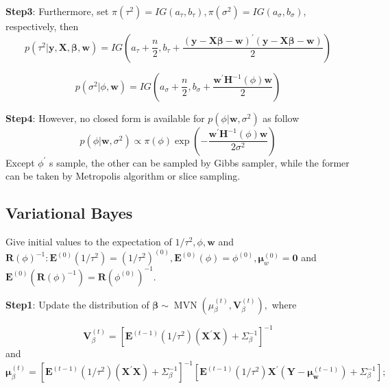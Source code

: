 \documentclass[
]{article}
\begin{document}
\textbf{Step3}: Furthermore, set
\(\pi\left(\tau^{2}\right)=I G\left(a_{\tau}, b_{\tau}\right), \pi\left(\sigma^{2}\right)=I G\left(a_{\sigma}, b_{\sigma}\right),\)
respectively, then \begin{equation}
p\left(\tau^{2} | \boldsymbol{y}, \boldsymbol{X}, \boldsymbol{\beta}, \boldsymbol{w}\right)=I G\left(a_{\tau}+\frac{n}{2}, b_{\tau}+\frac{(\boldsymbol{y}-\boldsymbol{X} \boldsymbol{\beta}-\boldsymbol{w})^{\prime}(\boldsymbol{y}-\boldsymbol{X} \boldsymbol{\beta}-\boldsymbol{w})}{2}\right)
\end{equation}

\begin{equation}
p\left(\sigma^{2} | \phi, \boldsymbol{w}\right)=I G\left(a_{\sigma}+\frac{n}{2}, b_{\sigma}+\frac{\boldsymbol{w}^{\prime} \boldsymbol{H}^{-1}(\phi) \boldsymbol{w}}{2}\right)
\end{equation}

\textbf{Step4}: However, no closed form is available for
\(p\left(\phi | \boldsymbol{w}, \sigma^{2}\right)\) as follow
\begin{equation}
p\left(\phi | \boldsymbol{w}, \sigma^{2}\right) \propto \pi(\phi) \exp \left(-\frac{\boldsymbol{w}^{\prime} \boldsymbol{H}^{-1}(\phi) \boldsymbol{w}}{2\sigma^2}\right)
\end{equation} Except \(\phi^{\prime}\) s sample, the other can be
sampled by Gibbs sampler, while the former can be taken by Metropolis
algorithm or slice sampling.

\hypertarget{variational-bayes}{%
\subsection{Variational Bayes}\label{variational-bayes}}

Give initial values to the expectation of
\(1 / \tau^{2}, \phi, \mathbf{w}\) and
\(\mathbf{R}(\phi)^{-1} : \mathbf{E}^{(0)}\left(1 / \tau^{2}\right)=\left(1 / \tau^{2}\right)^{(0)}, \mathbf{E}^{(0)}(\phi)=\phi^{(0)}, \bm{\mu}_{w}^{(0)}=\mathbf{0}\)
and
\(\mathbf{E}^{(0)}\left(\mathbf{R}(\phi)^{-1}\right)=\mathbf{R}\left(\phi^{(0)}\right)^{-1}.\)

\textbf{Step1}: Update the distribution of
\(\bm{\beta} \sim \operatorname{MVN}\left(\mu_{\beta}^{(t)}, \mathbf{V}_{\beta}^{(t)}\right),\)
where

\[\mathbf{V}_{\beta}^{(t)}=\left[\bm{E}^{(t-1)}\left(1 / \tau^{2}\right)\left(\mathbf{X}^{\prime} \mathbf{X}\right) + \Sigma_\beta^{- 1} \right]^{-1}\]
and
\[\bm{\mu}_{\beta}^{(t)}=\left[\bm{E}^{(t-1)}\left(1 / \tau^{2}\right)\left(\mathbf{X}^{\prime} \mathbf{X}\right) + \Sigma_\beta^{- 1} \right]^{-1} \left[\bm{E}^{(t-1)}\left(1 / \tau^{2}\right) \mathbf{X}^{\prime}\left(\mathbf{Y}-\boldsymbol{\mu}_{\mathbf{w}}^{(t-1)}\right) + \Sigma_\beta^{- 1}\right];\]
\end{document}
